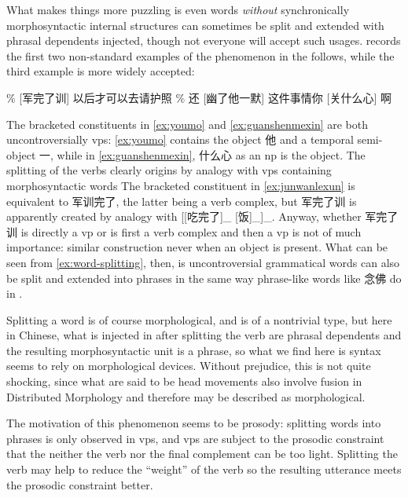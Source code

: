 \documentclass[UTF8, a4paper, oneside, scheme=plain]{ctexrep}
\newcommand*{\citesec}[1]{\S~{#1}}
\begin{document}
What makes things more puzzling is even words \emph{without} synchronically morphosyntactic internal structures 
can sometimes be split and extended
with phrasal dependents injected,
though not everyone will accept such usages.
\citet[\citesec{6.5.8}]{chao1965grammar} records the first two non-standard examples of the phenomenon
in the follows,
while the third example is more widely accepted:
\begin{exe}
    \ex\label{ex:word-splitting} \begin{xlist}
        \ex\label{ex:junwanlexun} \% [军完了训] 以后才可以去请护照
        \ex\label{ex:youmo} \% 还 [幽了他一默]
        \ex\label{ex:guanshenmexin} 这件事情你 [关什么心] 啊
    \end{xlist}
\end{exe}
The bracketed constituents in \eqref{ex:youmo} and \eqref{ex:guanshenmexin} 
are both uncontroversially \acs{vp}s:
\eqref{ex:youmo} contains the object 他 and a temporal semi-object 一, %
while in \eqref{ex:guanshenmexin}, 什么心 as an \ac{np} is the object.
The splitting of the verbs clearly origins 
by analogy with \ac{vp}s containing morphosyntactic words 
The bracketed constituent in \eqref{ex:junwanlexun} is equivalent to 军训完了,
the latter being a verb complex, %
but 军完了训 is apparently created by analogy with 
[[吃完了]_{} [饭]_{}]_{}.
Anyway, whether 军完了训 is directly a \ac{vp} or is first a verb complex 
and then a \ac{vp} is not of much importance:
similar construction never when an object is present.
What can be seen from \eqref{ex:word-splitting}, then, 
is uncontroversial grammatical words can also be split and extended into phrases 
in the same way phrase-like words like 念佛 do in 
.

Splitting a word is of course morphological,
and is of a nontrivial type,
but here in Chinese, what is injected in after splitting the verb are phrasal dependents 
and the resulting morphosyntactic unit is a phrase,
so what we find here is syntax seems to rely on morphological devices.
Without prejudice, this is not quite shocking,
since what are said to be head movements 
also involve fusion in Distributed Morphology 
and therefore may be described as morphological.

The motivation of this phenomenon seems to be prosody: 
splitting words into phrases is only observed in \ac{vp}s,
and \ac{vp}s are subject to the prosodic constraint 
that the neither the verb nor the final complement can be too light.
Splitting the verb may help to reduce the ``weight'' of the verb 
so the resulting utterance meets the prosodic constraint better.
\end{document}

